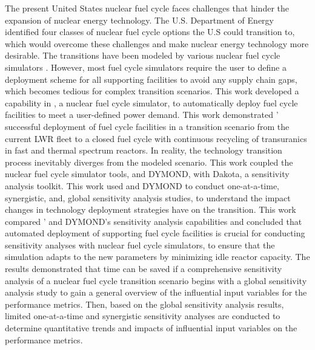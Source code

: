 \vspace{-1cm}
The present United States nuclear fuel cycle faces challenges that hinder 
the expansion of nuclear energy technology. 
The U.S. Department of Energy identified four classes of nuclear fuel cycle 
options the U.S could transition to, which would overcome these challenges 
and make nuclear energy technology more desirable. 
The transitions have been modeled by various nuclear fuel cycle simulators
\cite{feng_standardized_2016,bae_standardized_2019}. 
However, most fuel cycle simulators require the user to define a deployment 
scheme for all supporting facilities to avoid any supply chain gaps, which becomes 
tedious for complex transition scenarios.
This work developed a capability in \Cyclus, a nuclear fuel cycle simulator, 
to automatically deploy fuel cycle 
facilities to meet a user-defined power demand. 
This work demonstrated \Cyclus' successful deployment of fuel cycle facilities
in a transition scenario from the current 
LWR fleet to a closed fuel cycle with continuous recycling of transuranics in fast and 
thermal spectrum reactors.
In reality, the technology transition process inevitably diverges from the 
modeled scenario. 
This work coupled the nuclear fuel cycle simulator tools, \Cyclus and DYMOND, 
with Dakota, a sensitivity analysis toolkit. 
This work used \Cyclus and DYMOND to conduct one-at-a-time, synergistic, 
and, global sensitivity analysis studies, to understand the impact changes 
in technology deployment strategies have on the transition.
This work compared \Cyclus' and DYMOND's sensitivity analysis capabilities 
and concluded that automated deployment of supporting fuel cycle 
facilities is crucial for conducting sensitivity analyses 
with nuclear fuel cycle simulators, to ensure that the simulation 
adapts to the new parameters by minimizing idle reactor capacity. 
The results demonstrated that time can be saved if a comprehensive 
sensitivity analysis of a nuclear fuel cycle transition scenario 
begins with a global sensitivity analysis study to gain a general 
overview of the influential input variables for the performance metrics. 
Then, based on the global sensitivity analysis results, limited 
one-at-a-time and synergistic sensitivity analyses are conducted 
to determine quantitative trends and impacts of influential 
input variables on the performance metrics.